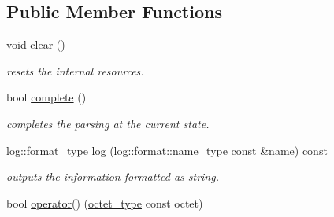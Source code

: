 \subsection*{Public Member Functions}
\begin{DoxyCompactItemize}
\item 
\hypertarget{classhryky_1_1http_1_1header_1_1name_1_1_reader_a1429ba14e42b28119949253d099674c3}{void \hyperlink{classhryky_1_1http_1_1header_1_1name_1_1_reader_a1429ba14e42b28119949253d099674c3}{clear} ()}\label{classhryky_1_1http_1_1header_1_1name_1_1_reader_a1429ba14e42b28119949253d099674c3}

\begin{DoxyCompactList}\small\item\em resets the internal resources. \end{DoxyCompactList}\item 
\hypertarget{classhryky_1_1http_1_1header_1_1name_1_1_reader_a6fab6f4154376da1c9f1801992a46a8a}{bool \hyperlink{classhryky_1_1http_1_1header_1_1name_1_1_reader_a6fab6f4154376da1c9f1801992a46a8a}{complete} ()}\label{classhryky_1_1http_1_1header_1_1name_1_1_reader_a6fab6f4154376da1c9f1801992a46a8a}

\begin{DoxyCompactList}\small\item\em completes the parsing at the current state. \end{DoxyCompactList}\item 
\hypertarget{classhryky_1_1http_1_1header_1_1name_1_1_reader_ac857faed100ded1902a5106bdab6e339}{\hyperlink{namespacehryky_1_1log_ad50448c3f934f1eacd5c1bcffe8111e1}{log\-::format\-\_\-type} \hyperlink{classhryky_1_1http_1_1header_1_1name_1_1_reader_ac857faed100ded1902a5106bdab6e339}{log} (\hyperlink{namespacehryky_1_1log_1_1format_ab7408d1e2ed2d648dbf9bba69eb74288}{log\-::format\-::name\-\_\-type} const \&name) const }\label{classhryky_1_1http_1_1header_1_1name_1_1_reader_ac857faed100ded1902a5106bdab6e339}

\begin{DoxyCompactList}\small\item\em outputs the information formatted as string. \end{DoxyCompactList}\item 
\hypertarget{classhryky_1_1http_1_1header_1_1name_1_1_reader_ad7d483b516096da2e5446ea5ad8ea6e6}{bool \hyperlink{classhryky_1_1http_1_1header_1_1name_1_1_reader_ad7d483b516096da2e5446ea5ad8ea6e6}{operator()} (\hyperlink{namespacehryky_a488cba8b666be33ccca70e819684e3c8}{octet\-\_\-type} const octet)}\label{classhryky_1_1http_1_1header_1_1name_1_1_reader_ad7d483b516096da2e5446ea5ad8ea6e6}


\end{DoxyCompactItemize}
